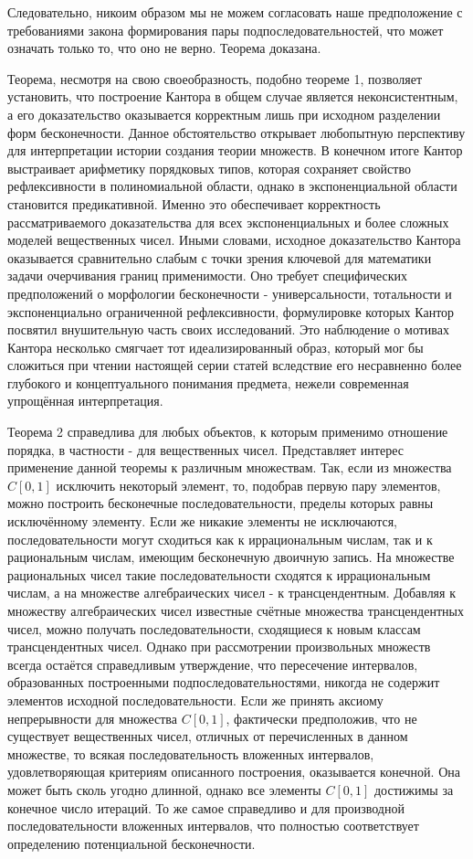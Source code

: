 \documentclass[12pt]{article}
\begin{document}
Следовательно, никоим образом мы не можем согласовать наше предположение с требованиями закона формирования пары подпоследовательностей, что может означать только то, что оно не верно. Теорема доказана.

Теорема, несмотря на свою своеобразность, подобно теореме 1, позволяет установить, что построение Кантора в общем случае является неконсистентным, а его доказательство оказывается корректным лишь при исходном разделении форм бесконечности. Данное обстоятельство открывает любопытную перспективу для интерпретации истории создания теории множеств. В конечном итоге Кантор выстраивает арифметику порядковых типов, которая сохраняет свойство рефлексивности в полиномиальной области, однако в экспоненциальной области становится предикативной. Именно это обеспечивает корректность рассматриваемого доказательства для всех экспоненциальных и более сложных моделей вещественных чисел. Иными словами, исходное доказательство Кантора оказывается сравнительно слабым с точки зрения ключевой для математики задачи очерчивания границ применимости. Оно требует специфических предположений о морфологии бесконечности - универсальности, тотальности и экспоненциально ограниченной рефлексивности, формулировке которых Кантор посвятил внушительную часть своих исследований. Это наблюдение о мотивах Кантора несколько смягчает тот идеализированный образ, который мог бы сложиться при чтении настоящей серии статей вследствие его несравненно более глубокого и концептуального понимания предмета, нежели современная упрощённая интерпретация.

Теорема 2 справедлива для любых объектов, к которым применимо отношение порядка, в частности - для вещественных чисел. Представляет интерес применение данной теоремы к различным множествам. Так, если из множества $C[0,1]$ исключить некоторый элемент, то, подобрав первую пару элементов, можно построить бесконечные последовательности, пределы которых равны исключённому элементу. Если же никакие элементы не исключаются, последовательности могут сходиться как к иррациональным числам, так и к рациональным числам, имеющим бесконечную двоичную запись. На множестве рациональных чисел такие последовательности сходятся к иррациональным числам, а на множестве алгебраических чисел - к трансцендентным. Добавляя к множеству алгебраических чисел известные счётные множества трансцендентных чисел, можно получать последовательности, сходящиеся к новым классам трансцендентных чисел. Однако при рассмотрении произвольных множеств всегда остаётся справедливым утверждение, что пересечение интервалов, образованных построенными подпоследовательностями, никогда не содержит элементов исходной последовательности. Если же принять аксиому непрерывности для множества $C[0,1]$, фактически предположив, что не существует вещественных чисел, отличных от перечисленных в данном множестве, то всякая последовательность вложенных интервалов, удовлетворяющая критериям описанного построения, оказывается конечной. Она может быть сколь угодно длинной, однако все элементы $C[0,1]$ достижимы за конечное число итераций. То же самое справедливо и для производной последовательности вложенных интервалов, что полностью соответствует определению потенциальной бесконечности.
\end{document}

